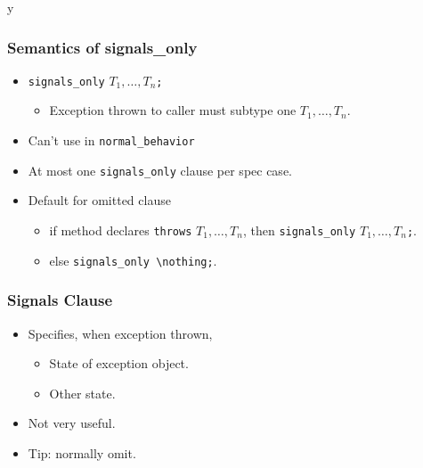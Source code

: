 \if y\MAKEHANDOUTS \documentclass[t,compress,landscape,handout]{beamer}
\begin{document}
\begin{frame}[fragile]
\frametitle{Semantics of signals\_only}

\begin{itemize}
\item
\lstinline!signals_only! $T_1, \ldots, T_n$\texttt{;}
\begin{itemize}
\item
Exception thrown to caller must subtype
one $T_1, \ldots, T_n$.
\end{itemize}

\item
Can't use in \lstinline!normal_behavior!

\item
At most one \lstinline!signals_only! clause per spec case.

\item
Default for omitted clause
\begin{itemize}
\item
if method declares \lstinline!throws! $T_1, \ldots, T_n$,
\newline
then \lstinline!signals_only! $T_1, \ldots, T_n$\texttt{;}.

\item
else \lstinline!signals_only \nothing;!.
\end{itemize}
\end{itemize}
\end{frame}

\begin{frame}
\frametitle{Signals Clause}

\begin{itemize}
\item
Specifies, when exception thrown,
\begin{itemize}
\item
State of exception object.

\item
Other state.
\end{itemize}

\item
Not very useful.

\item
Tip: normally omit.
\end{itemize}
\end{frame}
\end{document}
